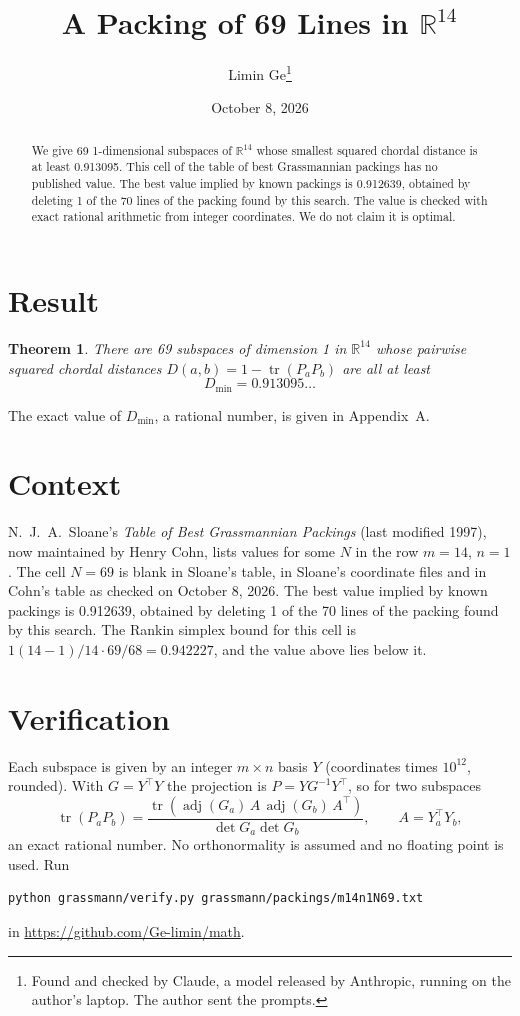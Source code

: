 \documentclass[11pt,a4paper]{article}
\title{A Packing of 69 Lines in $\mathbb{R}^{14}$}
\author{Limin Ge\thanks{Found and checked by Claude, a model released by Anthropic, running on the author's laptop. The author sent the prompts.}}
\date{October 8, 2026}
\newtheorem*{theorem}{Theorem}
\begin{document}
\maketitle
\begin{abstract}
We give 69 1-dimensional subspaces of $\mathbb{R}^{14}$ whose smallest squared chordal distance is at least 0.913095. This cell of the table of best Grassmannian packings has no published value. The best value implied by known packings is 0.912639, obtained by deleting 1 of the 70 lines of the packing found by this search. The value is checked with exact rational arithmetic from integer coordinates. We do not claim it is optimal.
\end{abstract}

\section{Result}
\begin{theorem}
There are 69 subspaces of dimension 1 in $\mathbb{R}^{14}$ whose pairwise squared chordal distances $D(a,b) = 1 - \operatorname{tr}(P_aP_b)$ are all at least
\[ D_{\min} = 0.913095\ldots \]
\end{theorem}
The exact value of $D_{\min}$, a rational number, is given in Appendix~A.


\section{Context}
N.~J.~A.~Sloane's \emph{Table of Best Grassmannian Packings} (last modified 1997), now maintained by Henry Cohn, lists values for some $N$ in the row $m=14$, $n=1$. The cell $N=69$ is blank in Sloane's table, in Sloane's coordinate files and in Cohn's table as checked on October 8, 2026. The best value implied by known packings is 0.912639, obtained by deleting 1 of the 70 lines of the packing found by this search. The Rankin simplex bound for this cell is $1(14-1)/14\cdot 69/68 = 0.942227$, and the value above lies below it.


\section{Verification}
Each subspace is given by an integer $m\times n$ basis $Y$ (coordinates times $10^{12}$, rounded). With $G=Y^\top Y$ the projection is $P=YG^{-1}Y^\top$, so for two subspaces
\[ \operatorname{tr}(P_aP_b)=\frac{\operatorname{tr}(\operatorname{adj}(G_a)\,A\,\operatorname{adj}(G_b)\,A^\top)}{\det G_a\det G_b},\qquad A=Y_a^\top Y_b, \]
an exact rational number. No orthonormality is assumed and no floating point is used. Run
\begin{verbatim}
python grassmann/verify.py grassmann/packings/m14n1N69.txt
\end{verbatim}
in \url{https://github.com/Ge-limin/math}.
\end{document}

